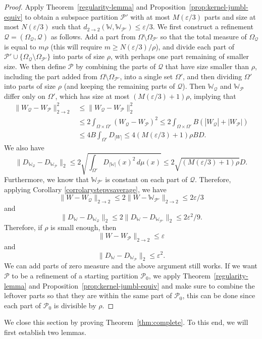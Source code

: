 \documentclass{amsart}
\numberwithin{equation}{section}
\numberwithin{figure}{section}
\theoremstyle{definition}
\theoremstyle{remark}
\newcommand{\eps}{\varepsilon}
\newcommand{\cP}{\mathcal{P}}
\newcommand{\cQ}{\mathcal{Q}}
\newcommand{\cW}{\mathbb{W}}
\newcommand{\sP}{\mathscr{P}}
\newcommand{\sQ}{\mathscr{Q}}
\def\d22{d_{2\to 2}}
\begin{document}
\begin{proof}
Apply Theorem~\ref{regularity-lemma} and
Proposition~\ref{prop:kernel-jumbl-equiv} to obtain a subspace partition
$\sP'$ with at most $M(\varepsilon/3)$ parts and size at most
$N(\varepsilon/3)$ such that $\d22(\cW,\cW_{\sP'})\leq \eps/3$.
 We first construct a refinement $\sQ=(\Omega_\sQ,\cQ)$ as
follows. Add a part from $\Omega \setminus \Omega_{\sP'}$ so that the total
measure of $\Omega_\sQ$ is equal to $m\rho$ (this will require $m\geq
N(\varepsilon/3)/\rho$), and divide each part of
$\cP'\cup\{\Omega_\sQ\setminus\Omega_{\sP'}\}$ into parts of size $\rho$,
with perhaps one part remaining of smaller size. We then define $\sP$ by
combining the parts of $\cQ$ that have size smaller than $\rho$, including
the part added from $\Omega \setminus \Omega_{\sP'}$, into a single set
$\Omega'$, and then dividing $\Omega'$ into parts of size $\rho$ (and keeping
the remaining parts of $\sQ$). Then $\cW_\cQ$ and $\cW_\cP$ differ only on
$\Omega'$, which has size at most $(M(\varepsilon/3)+1)\rho$, implying that
\begin{align*}
 \|W_\sQ-W_\sP\|_{2 \rightarrow 2}^2
 &\le \|W_\sQ-W_\sP\|_{2}^2\\
 &\le 2\int_{\Omega \times \Omega'}(W_\sQ-W_\sP)^2
 \le
 2\int_{\Omega\times\Omega'}B(|W_\sQ|+|W_\sP|)\\
 &\leq 4B\int_{\Omega'} D_{|W|} \le 4(M(\varepsilon/3)+1)\rho B D
 .
\end{align*}
We also have
\[
 \|D_{\cW_\sQ}-D_{\cW_\sP}\|_2 \le 2\sqrt{\int_{\Omega'} D_{|\cW|}(x)^2\,d\mu(x)} \le 2\sqrt{(M(\varepsilon/3)+1)\rho}D
.\]
Furthermore, we know that $\cW_{\sP'}$ is constant on each part of $\sQ$.
Therefore, applying Corollary \ref{corrolarystepvsaverage}, we have
\[\|W-W_\sQ\|_{2 \rightarrow 2} \le 2\|W-\cW_{\sP'}\|_{2 \rightarrow 2}\le 2\varepsilon/3\]
and
\[\|D_\cW-D_{\cW_\sQ}\|_2 \le 2 \|D_\cW-D_{\cW_{\sP'}}\|_2 \le 2\varepsilon^2/9
.\] Therefore, if $\rho$ is small enough, then
\[\|W-W_\sP\|_{2 \rightarrow 2} \le \varepsilon\]
and
\[\|D_\cW-D_{\cW_\sP}\|_2 \le \varepsilon^2
.\] We can add parts of zero measure and the above argument still works. If
we want $\sP$ to be a refinement of a starting partition $\sP_0$, we apply
Theorem~\ref{regularity-lemma} and Proposition~\ref{prop:kernel-jumbl-equiv}
and make sure to combine the leftover parts so that they are within the same
part of $\cP_0$, this can be done since each part of $\cP_0$ is divisible by
$\rho$.
\end{proof}

We close this section by proving Theorem~\ref{thm:complete}. To this end, we
will first establish two lemmas.
\end{document}
